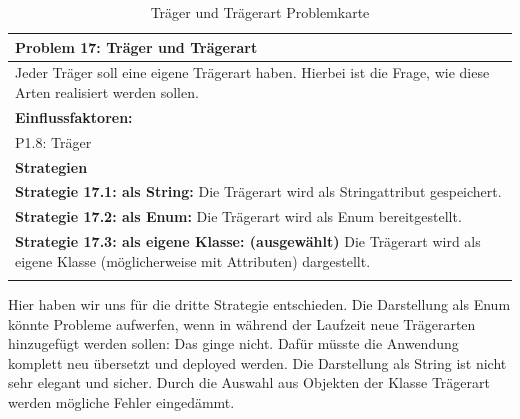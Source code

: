 \documentclass[enabledeprecatedfontcommands,fontsize=12pt,paper=a4,twoside]{scrartcl}
\begin{document}
\begin{table}[H]
    \centering
    \begin{tabular}{|p{15cm}|} 
    \hline
          \textbf{Problem 17:} Träger und Trägerart
          \\ \hline
          Jeder Träger soll eine eigene Trägerart haben. Hierbei ist die Frage, wie diese Arten realisiert werden sollen.
          \\ \hline
          \textbf{Einflussfaktoren: } \\
         P1.8: Träger \\ 
          \hline
          \textbf{Strategien} \\ \hline
		{}          
           \label{strategie:17.1} 
            \textbf{Strategie 17.1: als String:} Die Trägerart wird als Stringattribut gespeichert. \\
            {}          
           \label{strategie:17.2} 
	\textbf{Strategie 17.2: als Enum:} Die Trägerart wird als Enum bereitgestellt. \\
	 {}          
           \label{strategie:17.3} 
	\textbf{Strategie 17.3: als eigene Klasse: (ausgewählt)} Die Trägerart wird als eigene Klasse (möglicherweise mit Attributen) dargestellt. \\
          \\ \hline 
    \end{tabular}
    \caption{Träger und Trägerart Problemkarte}
    \label{tab:ProblemKarte17}
\end{table}
Hier haben wir uns für die dritte Strategie entschieden. Die Darstellung als Enum könnte Probleme aufwerfen, wenn in während der Laufzeit neue Trägerarten hinzugefügt werden sollen: Das ginge nicht. Dafür müsste die Anwendung komplett neu übersetzt und deployed werden. Die Darstellung als String ist nicht sehr elegant und sicher. Durch die Auswahl aus Objekten der Klasse Trägerart werden mögliche Fehler eingedämmt. \\
\end{document}
